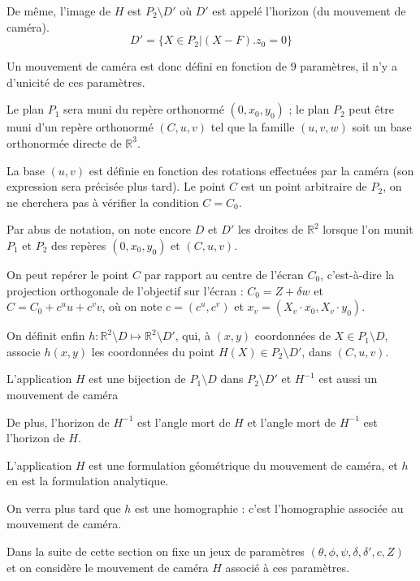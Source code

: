 \begin{defnot}
De même, l'image de $H$ est $P_2 \setminus D'$ où $D'$ est appelé l'horizon (du mouvement de caméra).
\begin{equation*}
D'=\{ X\in P_2 | (X-F).z_0=0\}
\end{equation*}

Un mouvement de caméra est donc défini en fonction de $9$ paramètres, il n'y a d'unicité de ces paramètres.

Le plan $P_1$ sera muni du repère orthonormé $(0,x_0,y_0)$ ; le plan $P_{2}$ peut être muni d'un repère orthonormé $(C,u,v)$ tel que la famille $(u,v,w)$ soit un base orthonormée directe de $\mathbb{R}^{3}$.

La base $(u,v)$ est définie en fonction des rotations effectuées par la caméra (son expression sera précisée plus tard). Le point $C$ est un point arbitraire de $P_2$, on ne cherchera pas à vérifier la condition $C=C_0$.

Par abus de notation, on note encore $D$ et $D'$ les droites de $\mathbb{R}^{2}$ lorsque l'on munit $P_1$ et $P_2$ des repères $(0,x_0,y_0)$ et $(C,u,v)$.

On peut repérer le point $C$ par rapport au centre de l'écran $C_{0}$, c'est-à-dire la projection orthogonale de l'objectif sur l'écran : $C_{0}=Z+\delta w$ et $C=C_{0}+c^{u}u+c^{v}v$, où on note $c=(c^u,c^v)$ et $x_v = (X_v \cdot x_0,X_v \cdot y_0)$.

On définit enfin $h:\mathbb{R}^{2} \setminus D \mapsto\mathbb{R}^{2}\setminus D'$, qui, à $(x,y)$ coordonnées de $X\in P_1\setminus D$, associe $h(x,y)$ les coordonnées du point $H(X)\in P_2 \setminus D'$, dans $(C,u,v)$.
\label{defpoint}
\end{defnot}

\begin{pte}
L'application $H$ est une bijection de $P_1 \setminus D$ dans $P_2 \setminus D'$ et $H^{-1}$ est aussi un mouvement de caméra

De plus, l'horizon de $H^{-1}$ est l'angle mort de $H$ et l'angle mort de $H^{-1}$ est l'horizon de $H$.
\end{pte}

\begin{remarque}
L'application $H$ est une formulation géométrique du mouvement de caméra, et $h$ en est la formulation analytique.

On verra plus tard que $h$ est une homographie : c'est l'homographie associée au mouvement de caméra.
\end{remarque}

Dans la suite de cette section on fixe un jeux de paramètres $(\theta,\phi,\psi,\delta,\delta',c,Z)$ et on considère le mouvement de caméra $H$ associé à ces paramètres.

